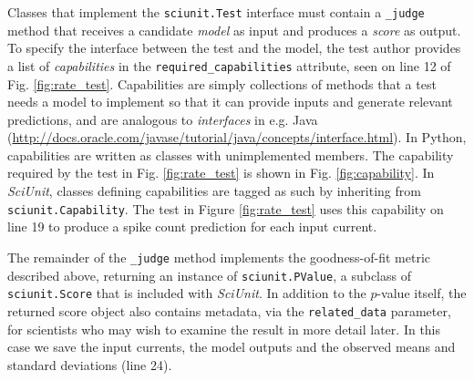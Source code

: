 \documentclass{frontiersSCNS}
\let\verbx\lstinline
\begin{document}
Classes that implement the \verbx{sciunit.Test} interface must contain a \verbx{_judge} method that receives a candidate \emph{model} as input and produces a \textit{score} as output. 
To specify the interface between the test and the model, the test author provides a list of \emph{capabilities} in the \verbx{required_capabilities} attribute, seen on line 12 of Fig. \ref{fig:rate_test}. 
Capabilities are simply collections of methods that a test needs a model to implement so that it can provide inputs and generate relevant predictions, and are analogous to \emph{interfaces} in e.g. Java (\url{http://docs.oracle.com/javase/tutorial/java/concepts/interface.html}). 
In Python, capabilities are written as classes with unimplemented members. 
The capability required by the test in Fig. \ref{fig:rate_test} is shown in Fig. \ref{fig:capability}. 
In \textit{SciUnit}, classes defining capabilities are tagged as such by inheriting from \verbx{sciunit.Capability}. 
The test in Figure \ref{fig:rate_test} uses this capability on line 19 to produce a spike count prediction for each input current. 

The remainder of the \verbx{_judge} method implements the goodness-of-fit metric described above, returning an instance of \verbx{sciunit.PValue}, a subclass of \verbx{sciunit.Score} that is included with \textit{SciUnit}. 
In addition to the $p$-value itself, the returned score object also contains metadata, via the \verbx{related_data} parameter, for scientists who may wish to examine the result in more detail later. 
In this case we save the input currents, the model outputs and the observed means and standard deviations (line 24). 
\end{document}
